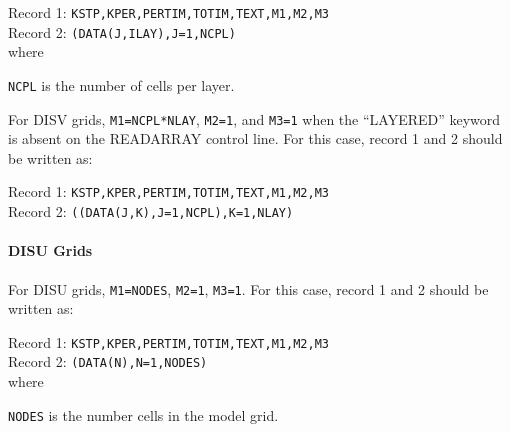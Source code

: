 \vspace{5mm}
\noindent Record 1: \texttt{KSTP,KPER,PERTIM,TOTIM,TEXT,M1,M2,M3} \\
\noindent Record 2: \texttt{(DATA(J,ILAY),J=1,NCPL)} \\

\vspace{5mm}
\noindent where

\begin{description} \itemsep0pt \parskip0pt 
\item \texttt{NCPL} is the number of cells per layer.
\end{description}

\noindent For DISV grids, \texttt{M1=NCPL*NLAY}, \texttt{M2=1}, and \texttt{M3=1} when the ``LAYERED'' keyword is absent on the READARRAY control line. For this case, record 1 and 2 should be written as:

\vspace{5mm}
\noindent Record 1: \texttt{KSTP,KPER,PERTIM,TOTIM,TEXT,M1,M2,M3} \\
\noindent Record 2: \texttt{((DATA(J,K),J=1,NCPL),K=1,NLAY)} \\


\paragraph{DISU Grids}
For DISU grids, \texttt{M1=NODES}, \texttt{M2=1}, \texttt{M3=1}. For this case, record 1 and 2 should be written as:


\vspace{5mm}
\noindent Record 1: \texttt{KSTP,KPER,PERTIM,TOTIM,TEXT,M1,M2,M3} \\
\noindent Record 2: \texttt{(DATA(N),N=1,NODES)} \\

\vspace{5mm}
\noindent where

\begin{description} \itemsep0pt \parskip0pt 
\item \texttt{NODES} is the number cells in the model grid.
\end{description}
